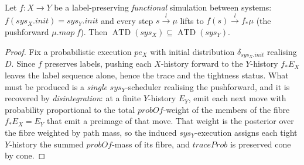 \begin{lemma}
  \label{lem:map}
  \leanok
  Let $f : X \to Y$ be a label-preserving \emph{functional} simulation between systems: $f(sys_X.init) = sys_Y.init$ and every step $s \xrightarrow{l} \mu$ lifts to $f(s) \xrightarrow{l} f_\ast\mu$ (the pushforward $\mu.map\ f$).
  Then $\operatorname{ATD}(sys_X) \subseteq \operatorname{ATD}(sys_Y)$.
\end{lemma}

\begin{proof}\leanok
  Fix a probabilistic execution $pe_X$ with initial distribution $\delta_{sys_X.init}$ realising $D$.
  Since $f$ preserves labels, pushing each $X$-history forward to the $Y$-history $f_\ast E_X$ leaves the label sequence alone, hence the trace and the tightness status.
  What must be produced is a \emph{single} $sys_Y$-scheduler realising the pushforward, and it is recovered by \emph{disintegration}: at a finite $Y$-history $E_Y$, emit each next move with probability proportional to the total $probOf$-weight of the members of the fibre $f_\ast E_X = E_Y$ that emit a preimage of that move.
  That weight is the posterior over the fibre weighted by path mass, so the induced $sys_Y$-execution assigns each tight $Y$-history the summed $probOf$-mass of its fibre, and $traceProb$ is preserved cone by cone.
\end{proof}
